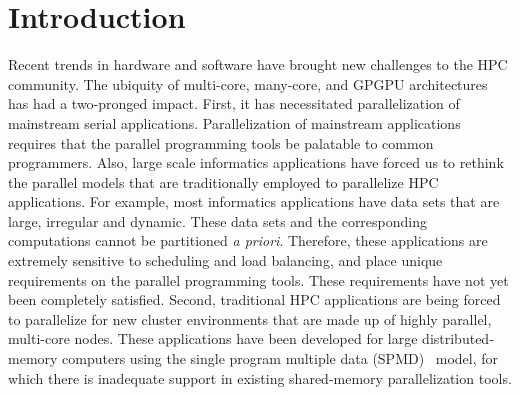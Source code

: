 \documentclass{sig-alternate}
\begin{document}
\section{Introduction}
Recent trends in hardware and software have brought new challenges to the HPC
community.  
The ubiquity of multi-core, many-core, and GPGPU architectures has had a
two-pronged impact. 
% 
First, it has necessitated parallelization of mainstream serial applications.
Parallelization of mainstream applications requires that the parallel
programming tools be palatable to common programmers.
Also, large scale informatics applications have forced us to rethink the
parallel models that are traditionally employed to parallelize HPC
applications.  For example, most informatics applications have data sets that
are large, irregular and dynamic. These data sets and the corresponding
computations cannot be partitioned \textit{a priori}.  Therefore, these
applications are extremely sensitive to scheduling and load balancing, and
place unique requirements on the parallel programming tools. These
requirements have not yet been completely satisfied.  Second, traditional HPC
applications are being forced to parallelize for new cluster environments that
are made up of highly parallel, multi-core nodes.  These applications have been
developed for large distributed-memory computers using the single program
multiple data (SPMD)~\cite{darema2001} model, for which there is inadequate
support in existing shared-memory parallelization tools.
\end{document}
